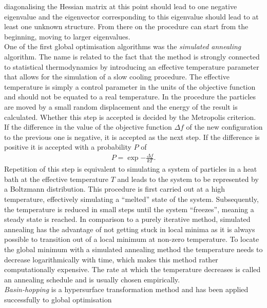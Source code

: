 diagonalising the Hessian matrix at this point should lead to one negative
eigenvalue and the eigenvector corresponding to this eigenvalue should lead to
at least one unknown structure. From there on the procedure can start from
the beginning, moving to larger eigenvalues.
%
\\\newline
One of the first global optimisation algorithms was the \textit{simulated
annealing} algorithm.\autocite{Kirkpatrick_OptimizationSimulatedAnnealing_1983} The
name is related to the fact that the method is strongly connected to statistical
thermodynamics by introducing an effective temperature parameter that allows for
the simulation of a slow cooling procedure. The effective temperature is simply
a control parameter in the units of the objective function and should not be
equated to a real temperature. In the procedure the particles are moved by a
small random displacement and the energy of the result is calculated. Whether
this step is accepted is decided by the Metropolis
criterion.\autocite{Metropolis_EquationStateCalculations_1953} If the difference
in the value of the objective function $\Delta f$ of the new configuration to
the previous one is negative, it is accepted as the next step. If the difference
is positive it is accepted with a probability $P$ of
%
\begin{align}
    P = \exp{-\frac{\Delta f}{kT}}.
\end{align}
%
Repetition of this step is equivalent to simulating a system of particles in a
heat bath at the effective temperature $T$ and leads to the system to be
represented by a Boltzmann distribution. This procedure is first carried out at
a high temperature, effectively simulating a ``melted'' state of the system.
Subsequently, the temperature is reduced in small steps until the system
``freezes'', meaning a steady state is reached. In comparison to a purely
iterative method, simulated annealing has the advantage of not getting stuck in
local minima as it is always possible to transition out of a local minimum at
non-zero temperature. To locate the global minimum with a simulated annealing
method the temperature needs to decrease logarithmically with time, which makes
this method rather computationally expensive. The rate at which the temperature
decreases is called an annealing schedule and is usually chosen empirically.
%
\\\newline
\textit{Basin-hopping} is a hypersurface transformation method and has been
applied successfully to global optimisation
